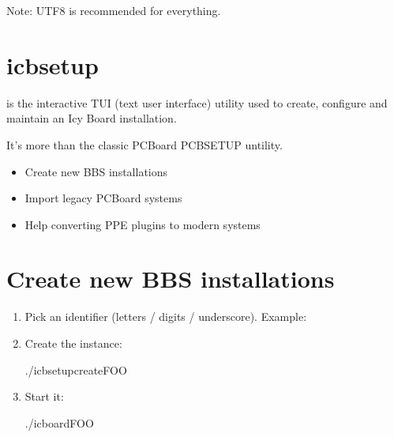 \documentclass[letterpaper,10pt,english]{sphinxmanual}
\begin{document}
\sphinxAtStartPar
Note: UTF\sphinxhyphen{}8 is recommended for everything.


\section{icbsetup}
\label{\detokenize{index:icbsetup}}
\sphinxAtStartPar
{} is the interactive TUI (text user interface) utility
used to create, configure and maintain an Icy Board installation.

\sphinxAtStartPar
It’s more than the classic PCBoard PCBSETUP untility.
\begin{itemize}
\item {} 
\sphinxAtStartPar
Create new BBS installations

\item {} 
\sphinxAtStartPar
Import legacy PCBoard systems

\item {} 
\sphinxAtStartPar
Help converting PPE plugins to modern systems

\end{itemize}


\section{Create new BBS installations}
\label{\detokenize{index:create-new-bbs-installations}}\begin{enumerate}
%
\item {} 
\sphinxAtStartPar
Pick an identifier (letters / digits / underscore). Example: 

\item {} 
\sphinxAtStartPar
Create the instance:

\begin{sphinxVerbatim}[commandchars=\\\{\}]
./icbsetupcreateFOO
\end{sphinxVerbatim}

\item {} 
\sphinxAtStartPar
Start it:

\begin{sphinxVerbatim}[commandchars=\\\{\}]
./icboardFOO
\end{sphinxVerbatim}

\end{enumerate}
\end{document}
